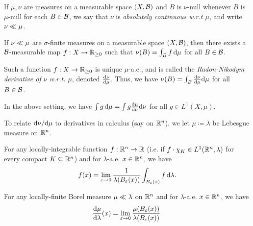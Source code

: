 \documentclass[reqno, twoside]{article}
\begin{document}
    \begin{definition}
        If $\mu,\nu$ are measures on a measurable space $(X,\mathcal{B})$ and $B$ is $\nu$-null whenever $B$ is $\mu$-null for each $B\in\mathcal{B}$, we say that $\nu$ is \textit{absolutely continuous w.r.t $\mu$}, and write $\nu\ll\mu$.
    \end{definition}

    \begin{theorem}
        If $\nu\ll\mu$ are $\sigma$-finite measures on a measurable space $(X,\mathcal{B})$, then there exists a $\mathcal{B}$-measurable map $f:X\to\mathbb{R}_{\geq0}$ such that $\nu(B)=\int_Bf\,\mathrm{d}\mu$ for all $B\in\mathcal{B}$.
    \end{theorem}

    Such a function $f:X\to\mathbb{R}_{\geq0}$ is unique $\mu$-a.e., and is called the \textit{Radon-Nikodym derivative of $\nu$ w.r.t. $\mu$}, denoted $\frac{\mathrm{d}\nu}{\mathrm{d}\mu}$. Thus, we have $\nu(B)=\int_B\frac{\mathrm{d}\nu}{\mathrm{d}\mu}\mathrm{d}\mu$ for all $B\in\mathcal{B}$.

    \begin{corollary}
        In the above setting, we have $\int g\,\mathrm{d}\mu=\int g\frac{\mathrm{d}\mu}{\mathrm{d}\nu}\mathrm{d}\nu$ for all $g\in L^1(X,\mu)$.
    \end{corollary}

    To relate $\mathrm{d}\nu/\mathrm{d}\mu$ to derivatives in calculus (say on $\mathbb{R}^n$), we let $\mu\coloneqq\lambda$ be Lebesgue measure on $\mathbb{R}^n$.

    \begin{theorem}
        For any locally-integrable function $f:\mathbb{R}^n\to\mathbb{R}$ (i.e. if $f\cdot\chi_K\in L^1(\mathbb{R}^n,\lambda)$ for every compact $K\subseteq\mathbb{R}^n$) and for $\lambda$-a.e. $x\in\mathbb{R}^n$, we have
        \vspace{-0.05in}
        \begin{equation*}
            f(x)=\lim_{\epsilon\to0}\frac{1}{\lambda(B_\epsilon(x))}\int_{B_\epsilon(x)}f\,\d\lambda.
            \vspace{-0.05in}
        \end{equation*}
    \end{theorem}

    \begin{corollary}
        For any locally-finite Borel measure $\mu\ll\lambda$ on $\mathbb{R}^n$ and for $\lambda$-a.e. $x\in\mathbb{R}^n$, we have
        \vspace{-0.05in}
        \begin{equation*}
            \frac{\d\mu}{\d\lambda}(x)=\lim_{\epsilon\to0}\frac{\mu(B_\epsilon(x))}{\lambda(B_\epsilon(x))}.
            \vspace{-0.05in}
        \end{equation*}
    \end{corollary}
\end{document}
